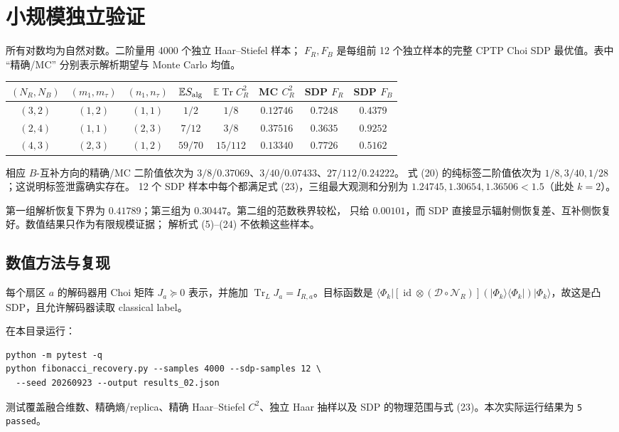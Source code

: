 \documentclass[UTF8,11pt,a4paper]{ctexart}
\theoremstyle{definition}
\newcommand{\Tr}{\operatorname{Tr}}
\newcommand{\E}{\mathbb E}
\newcommand{\cN}{\mathcal N}
\newcommand{\cD}{\mathcal D}
\newcommand{\ket}[1]{\lvert #1\rangle}
\newcommand{\bra}[1]{\langle #1\rvert}
\begin{document}
\section{小规模独立验证}

所有对数均为自然对数。二阶量用 4000 个独立 Haar--Stiefel 样本；
$F_R,F_B$ 是每组前 12 个独立样本的完整 CPTP Choi SDP 最优值。表中 ``精确/MC''
分别表示解析期望与 Monte Carlo 均值。

\begin{center}
\small
\begin{tabular}{cccccccc}
\toprule
$(N_R,N_B)$ & $(m_1,m_\tau)$ & $(n_1,n_\tau)$ &
$\E S_{\rm alg}$ & $\E\Tr C_R^2$ & MC $C_R^2$ & SDP $F_R$ & SDP $F_B$\\
\midrule
$(3,2)$ & $(1,2)$ & $(1,1)$ & $1/2$ & $1/8$ & $0.12746$ & $0.7248$ & $0.4379$\\
$(2,4)$ & $(1,1)$ & $(2,3)$ & $7/12$ & $3/8$ & $0.37516$ & $0.3635$ & $0.9252$\\
$(4,3)$ & $(2,3)$ & $(1,2)$ & $59/70$ & $15/112$ & $0.13340$ & $0.7726$ & $0.5162$\\
\bottomrule
\end{tabular}
\end{center}

相应 $B$-互补方向的精确/MC 二阶值依次为
$3/8$/$0.37069$、$3/40$/$0.07433$、$27/112$/$0.24222$。
式 (20) 的纯标签二阶值依次为 $1/8,3/40,1/28$；这说明标签泄露确实存在。
12 个 SDP 样本中每个都满足式 (23)，三组最大观测和分别为
$1.24745,1.30654,1.36506<1.5$（此处 $k=2$）。

第一组解析恢复下界为 $0.41789$；第三组为 $0.30447$。第二组的范数秩界较松，
只给 $0.00101$，而 SDP 直接显示辐射侧恢复差、互补侧恢复好。数值结果只作为有限规模证据；
解析式 (5)--(24) 不依赖这些样本。

\subsection*{数值方法与复现}

每个扇区 $a$ 的解码器用 Choi 矩阵 $J_a\succeq0$ 表示，并施加
$\Tr_{L}J_a=I_{R,a}$。目标函数是
$\bra{\Phi_k}[\operatorname{id}\otimes(\cD\circ\cN_R)]
(\ket{\Phi_k}\!\bra{\Phi_k})\ket{\Phi_k}$，故这是凸 SDP，且允许解码器读取 classical label。

在本目录运行：
\begin{lstlisting}
python -m pytest -q
python fibonacci_recovery.py --samples 4000 --sdp-samples 12 \
  --seed 20260923 --output results_02.json
\end{lstlisting}
测试覆盖融合维数、精确熵/replica、精确 Haar--Stiefel $C^2$、独立 Haar 抽样以及
SDP 的物理范围与式 (23)。本次实际运行结果为 \texttt{5 passed}。
\end{document}
